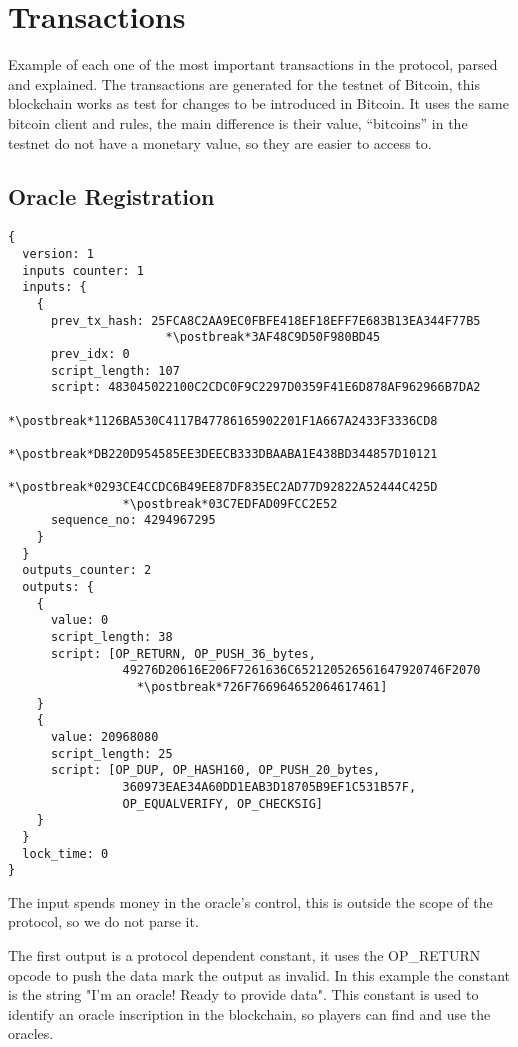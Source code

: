 \section{Transactions}
Example of each one of the most important transactions in the protocol,
  parsed and explained.
The transactions are generated for the testnet of Bitcoin, this blockchain
  works as test for changes to be introduced in Bitcoin.
It uses the same bitcoin client and rules, the main difference is their value,
  ``bitcoins'' in the testnet do not have a monetary value, so they are easier
  to access to.

\lstset{%
  basicstyle=\ttfamily,
  columns=fullflexible,
  tabsize=2,
  linewidth=10cm,
  escapechar=*,
}
\newcommand{\postbreak}[0]{\mbox{\textcolor{red}{$\hookrightarrow$}\space}}
\subsection{Oracle Registration}
\begin{lstlisting}
{
  version: 1
  inputs counter: 1
  inputs: {
    {
      prev_tx_hash: 25FCA8C2AA9EC0FBFE418EF18EFF7E683B13EA344F77B5
                      *\postbreak*3AF48C9D50F980BD45
      prev_idx: 0
      script_length: 107
      script: 483045022100C2CDC0F9C2297D0359F41E6D878AF962966B7DA2
                *\postbreak*1126BA530C4117B47786165902201F1A667A2433F3336CD8
                *\postbreak*DB220D954585EE3DEECB333DBAABA1E438BD344857D10121
                *\postbreak*0293CE4CCDC6B49EE87DF835EC2AD77D92822A52444C425D
                *\postbreak*03C7EDFAD09FCC2E52
      sequence_no: 4294967295
    }
  }
  outputs_counter: 2
  outputs: {
    {
      value: 0
      script_length: 38
      script: [OP_RETURN, OP_PUSH_36_bytes,
                49276D20616E206F7261636C652120526561647920746F2070
                  *\postbreak*726F766964652064617461]
    }
    {
      value: 20968080
      script_length: 25
      script: [OP_DUP, OP_HASH160, OP_PUSH_20_bytes,
                360973EAE34A60DD1EAB3D18705B9EF1C531B57F,
                OP_EQUALVERIFY, OP_CHECKSIG]
    }
  }
  lock_time: 0
}
\end{lstlisting}

The input spends money in the oracle's control, this is outside the scope
  of the protocol, so we do not parse it.

The first output is a protocol dependent constant, it uses the OP\_RETURN opcode
  to push the data mark the output as invalid.
In this example the constant is the string
  "I'm an oracle! Ready to provide data".
This constant is used to identify an oracle inscription in the blockchain, so
  players can find and use the oracles.

